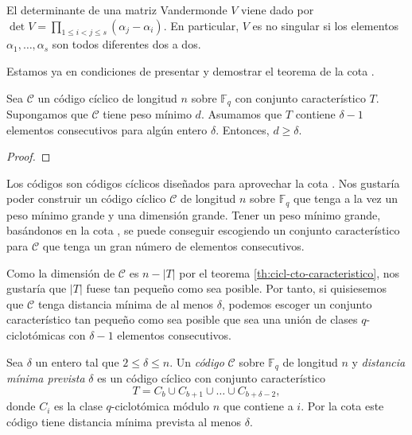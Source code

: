 \begin{lemma}
  El determinante de una matriz Vandermonde \(V\) viene dado por \(\operatorname{det}V = \prod_{1 \leq i < j \leq s}(\alpha_j - \alpha_i)\).
  En particular, \(V\) es no singular si los elementos \(\alpha_1, \dots, \alpha_s\) son todos diferentes dos a dos.
\end{lemma}

Estamos ya en condiciones de presentar y demostrar el teorema de la cota .

\begin{theorem}
  Sea \(\mathcal C\) un código cíclico de longitud \(n\) sobre \(\mathbb F_q\) con conjunto característico \(T\).
  Supongamos que \(\mathcal C\) tiene peso mínimo \(d\).
  Asumamos que \(T\) contiene \(\delta - 1\) elementos consecutivos para algún entero \(\delta\).
  Entonces, \(d \geq \delta\).
\end{theorem}

\begin{proof}
  
\end{proof}

Los códigos  son códigos cíclicos diseñados para aprovechar la cota .
Nos gustaría poder construir un código cíclico \(\mathcal C\) de longitud \(n\) sobre \(\mathbb F_q\) que tenga a la vez un peso mínimo grande y una dimensión grande.
Tener un peso mínimo grande, basándonos en la cota , se puede conseguir escogiendo un conjunto característico para \(\mathcal C\) que tenga un gran número de elementos consecutivos.

Como la dimensión de \(\mathcal C\) es \(n - |T|\) por el teorema \ref{th:cicl-cto-caracteristico}, nos gustaría que \(|T|\) fuese tan pequeño como sea posible.
Por tanto, si quisiesemos que \(\mathcal C\) tenga distancia mínima de al menos \(\delta\), podemos escoger un conjunto característico tan pequeño como sea posible que sea una unión de clases \(q\)-ciclotómicas con \(\delta - 1\) elementos consecutivos.

Sea \(\delta\) un entero tal que \(2 \leq \delta \leq n\). Un \textit{código } \(\mathcal C\) sobre \(\mathbb F_q\) de longitud \(n\) y \textit{distancia mínima prevista} \(\delta\) es un código cíclico con conjunto característico
\begin{equation}
  \label{eq:bch-conjunto-caracteristico}
  T = C_b \cup C_{b+1} \cup \dots \cup C_{b + \delta - 2},
\end{equation}
donde \(C_i\) es la clase \(q\)-ciclotómica módulo \(n\) que contiene a \(i\).
Por la cota  este código tiene distancia mínima prevista al menos \(\delta\).

